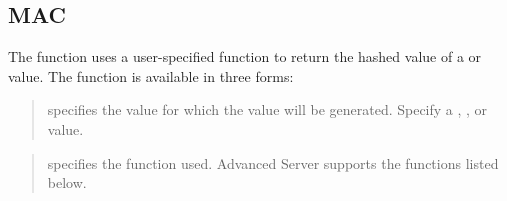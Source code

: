 \documentclass[letterpaper,10pt,english,openany,oneside]{sphinxmanual}
\begin{document}
\subsection{MAC}
\label{\detokenize{mac::doc}}\label{\detokenize{mac:mac}}
The  function uses a user-specified  function to return the hashed
 value of a  or  value. The  function is available in three
forms:
\begin{quote}

\begin{DUlineblock}{0em}
\item[] 
\item[]
\begin{DUlineblock}{\DUlineblockindent}
\item[] 
\end{DUlineblock}
\end{DUlineblock}

\begin{DUlineblock}{0em}
\item[] 
\item[]
\begin{DUlineblock}{\DUlineblockindent}
\item[] 
\end{DUlineblock}
\end{DUlineblock}
\end{quote}


\begin{quote}

 specifies the value for which the  value will be generated.
Specify a , , or  value.
\end{quote}

\begin{quote}

 specifies the  function used. Advanced Server supports the
 functions listed below.
\end{quote}
\end{document}
